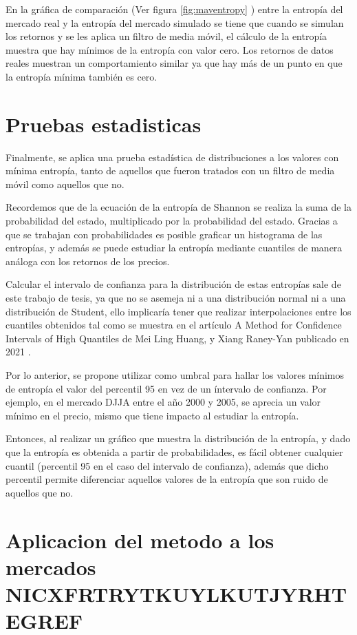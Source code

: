En la gráfica de comparación (Ver figura \ref{fig:maventropy} ) entre la entropía del mercado real y la entropía del mercado simulado se tiene que cuando se simulan los retornos y se les aplica un filtro de media móvil, el cálculo de la entropía muestra que hay mínimos de la entropía con valor cero. Los retornos de datos reales muestran un comportamiento similar ya que hay más de un punto en que la entropía mínima también es cero.


\section{Pruebas estadisticas}

Finalmente, se aplica una prueba estadística de distribuciones a los valores con mínima entropía, tanto de aquellos que fueron tratados con un filtro de media móvil como aquellos que no. 


Recordemos que de la ecuación de la entropía de Shannon se realiza la suma de la probabilidad del estado, multiplicado por la probabilidad del estado. Gracias a que se trabajan con probabilidades es posible graficar un histograma de las entropías, y además se puede estudiar la entropía mediante cuantiles de manera análoga con los retornos de los precios.

Calcular el intervalo de confianza para la distribución de estas entropías sale de este trabajo de tesis, ya que no se asemeja ni a una distribución normal ni a una distribución de Student, ello implicaría tener que realizar interpolaciones entre los cuantiles obtenidos tal como se muestra en el artículo A Method for Confidence Intervals of High Quantiles de Mei Ling Huang, y Xiang Raney-Yan publicado en 2021 \citep[][]{Huang2021}. 

Por lo anterior, se propone utilizar como umbral para hallar los valores mínimos de entropía el valor del percentil 95 en vez de un íntervalo de confianza. Por ejemplo, en el mercado DJJA entre el año 2000 y 2005, se aprecia un valor mínimo en el precio, mismo que tiene impacto al estudiar la entropía.


Entonces, al realizar un gráfico que muestra la distribución de la entropía, y dado que la entropía es obtenida a partir de probabilidades, es fácil obtener cualquier cuantil (percentil 95 en el caso del intervalo de confianza), además que dicho percentil permite diferenciar aquellos valores de la entropía que son ruido de aquellos que no. 


\section{Aplicacion del metodo a los mercados NICXFRTRYTKUYLKUTJYRHTEGREF}

